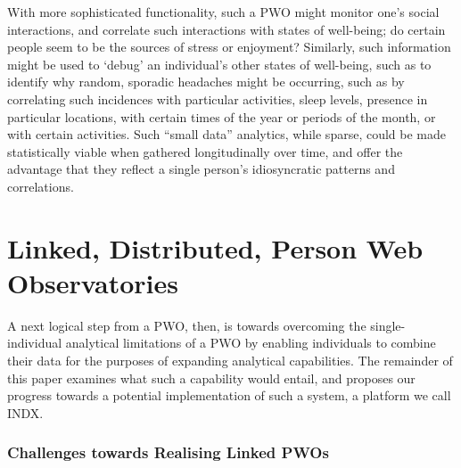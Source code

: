 \documentclass{acm_proc_article-sp}
\begin{document}
With more sophisticated functionality, such a PWO might monitor one's social interactions, and correlate such interactions with states of well-being; do certain people seem to be the sources of stress or enjoyment? Similarly, such information might be used to `debug' an individual's other states of well-being, such as to identify why random, sporadic headaches might be occurring, such as by correlating such incidences with particular activities, sleep levels, presence in particular locations, with certain times of the year or periods of the month, or with certain activities. Such ``small data'' analytics, while sparse, could be made statistically viable when gathered longitudinally over time, and offer the advantage that they reflect a single person's idiosyncratic patterns and correlations.

\section{Linked, Distributed, Person Web Observatories}

A next logical step from a PWO, then, is towards overcoming the single-individual analytical limitations of a PWO by enabling individuals to combine their data for the purposes of expanding analytical capabilities.  The remainder of this paper examines what such a capability would entail, and proposes our progress towards a potential implementation of such a system, a platform we call INDX. 

\subsubsection{Challenges towards Realising Linked PWOs}

\end{document}
